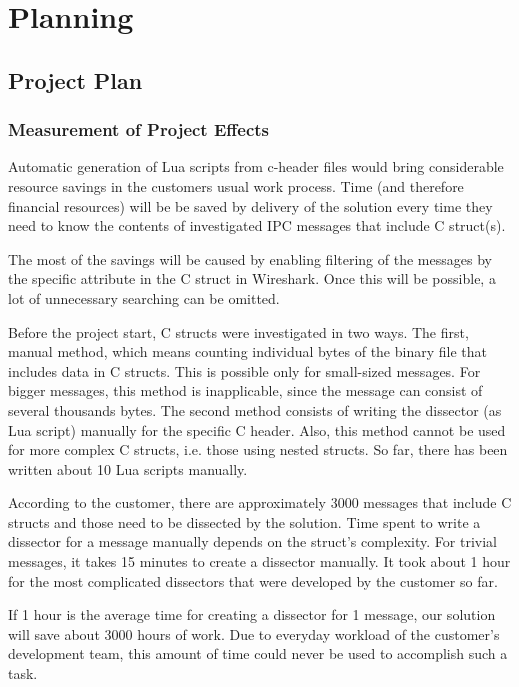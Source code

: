 \chapter{Planning}

\section{Project Plan}

\subsection{Measurement of Project Effects}
Automatic generation of Lua scripts from c-header files would bring considerable resource savings in the customers usual work process. Time (and therefore financial resources) will be  be saved by delivery of the solution every time they need to know the contents of investigated IPC messages that include C struct(s).

The most of the savings will be caused by enabling filtering of the messages by the specific attribute in the C struct in Wireshark. Once this will be possible, a lot of unnecessary searching can be omitted.

Before the project start, C structs were investigated in two ways. The first, manual method, which means counting individual bytes of the binary file that includes data in C structs. This is possible only for small-sized messages. For bigger messages, this method is inapplicable, since the message can consist of several thousands bytes. The second method consists of writing the dissector (as Lua script) manually for the specific C header. Also, this method cannot be used for more complex C structs, i.e. those using nested structs. So far, there has been written about 10 Lua scripts manually.

According to the customer, there are approximately 3000 messages that include C structs and those need to be dissected by the solution. Time spent to write a dissector for a message manually depends on the struct’s complexity. For trivial messages, it takes 15 minutes to create a dissector manually. It took about 1 hour for the most complicated dissectors that were developed by the customer so far.

If 1 hour is the average time for creating a dissector for 1 message, our solution will save about 3000 hours of work. Due to everyday workload of the customer’s development team, this amount of time could never be used to accomplish such a task.

